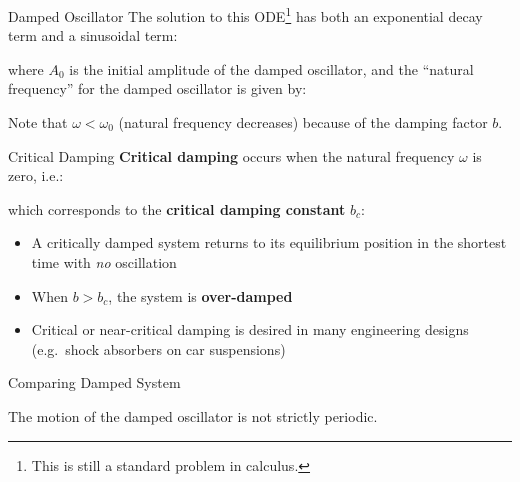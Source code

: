 \documentclass[12pt,compress,aspectratio=169]{beamer}
\begin{document}
\begin{frame}{Damped Oscillator}
  The solution to this ODE\footnote{This is still a standard problem in
    calculus.} has both an {\color{magenta}exponential decay term} and a
  {\color{cyan}sinusoidal term}:


  where $A_0$ is the initial amplitude of the damped oscillator,
  and the ``natural frequency'' for the damped oscillator is given by:

  
  Note that $\omega<\omega_0$ (natural frequency decreases) because of the
  damping factor $b$.
  \vspace{.3in}
\end{frame}



\begin{frame}{Critical Damping}
  \textbf{Critical damping} occurs when the natural frequency $\omega$ is zero,
  i.e.:
  

  which corresponds to the \textbf{critical damping constant} $b_c$:

  \begin{itemize}
  \item A critically damped system returns to its equilibrium position in the
    shortest time with \emph{no} oscillation
  \item When $b>b_c$, the system is \textbf{over-damped}
  \item Critical or near-critical damping is desired in many engineering
    designs (e.g.\ shock absorbers on car suspensions)
  \end{itemize}
\end{frame}



\begin{frame}{Comparing Damped System}
  \centering
  
  The motion of the damped oscillator is not strictly periodic.
\end{frame}



%
%
%
%
%
\end{document}
